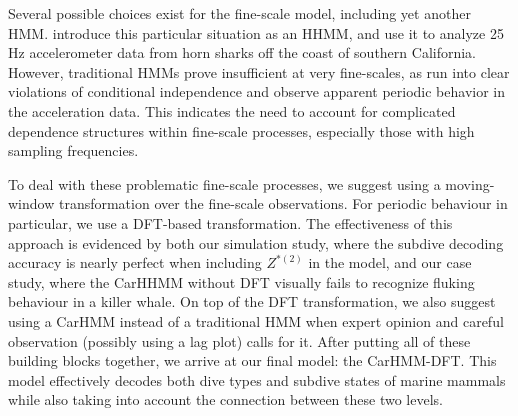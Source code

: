 Several possible choices exist for the fine-scale model, including yet another HMM. \citet{Barajas:2017} introduce this particular situation as an HHMM, and \citet{Adam:2019} use it to analyze 25 Hz accelerometer data from horn sharks off the coast of southern California. However, traditional HMMs prove insufficient at very fine-scales, as \citet{Adam:2019} run into clear violations of conditional independence and observe apparent periodic behavior in the acceleration data. This indicates the need to account for complicated dependence structures within fine-scale processes, especially those with high sampling frequencies. 




To deal with these problematic fine-scale processes, we suggest using a moving-window transformation over the fine-scale observations. For periodic behaviour in particular, we use a DFT-based transformation. The effectiveness of this approach is evidenced by both our simulation study, where the subdive decoding accuracy is nearly perfect when including $Z^{*(2)}$ in the model, and our case study, where the CarHHMM without DFT visually fails to recognize fluking behaviour in a killer whale. On top of the DFT transformation, we also suggest using a CarHMM instead of a traditional HMM when expert opinion and careful observation (possibly using a lag plot) calls for it. After putting all of these building blocks together, we arrive at our final model: the CarHMM-DFT. This model effectively decodes both dive types and subdive states of marine mammals while also taking into account the connection between these two levels. 

